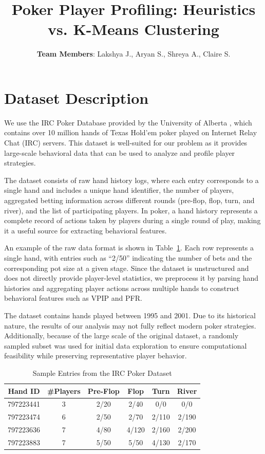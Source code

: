 \documentclass[11pt]{extarticle}
\title{Poker Player Profiling: Heuristics vs. K-Means Clustering}
\author{\textbf{Team Members}: Lakshya J., Aryan S., Shreya A., Claire S.\\}
\date{}
\begin{document}
\maketitle

\section{Dataset Description}
We use the IRC Poker Database provided by the University of Alberta \cite{irc_poker_dataset}, which contains over 10 million hands of Texas Hold'em poker played on Internet Relay Chat (IRC) servers. This dataset is well-suited for our problem as it provides large-scale behavioral data that can be used to analyze and profile player strategies.

The dataset consists of raw hand history logs, where each entry corresponds to a single hand and includes a unique hand identifier, the number of players, aggregated betting information across different rounds (pre-flop, flop, turn, and river), and the list of participating players. In poker, a hand history represents a complete record of actions taken by players during a single round of play, making it a useful source for extracting behavioral features.

An example of the raw data format is shown in Table~\ref{tab:dataset_sample}. Each row represents a single hand, with entries such as ``2/50'' indicating the number of bets and the corresponding pot size at a given stage. Since the dataset is unstructured and does not directly provide player-level statistics, we preprocess it by parsing hand histories and aggregating player actions across multiple hands to construct behavioral features such as VPIP and PFR.

The dataset contains hands played between 1995 and 2001. Due to its historical nature, the results of our analysis may not fully reflect modern poker strategies. Additionally, because of the large scale of the original dataset, a randomly sampled subset was used for initial data exploration to ensure computational feasibility while preserving representative player behavior.

\begin{table}[h]
\centering
\small
\begin{tabular}{c c c c c c}
\hline
Hand ID & \#Players & Pre-Flop & Flop & Turn & River \\
\hline
797223441 & 3 & 2/20 & 2/40 & 0/0 & 0/0 \\
797223474 & 6 & 2/50 & 2/70 & 2/110 & 2/190 \\
797223636 & 7 & 4/80 & 4/120 & 2/160 & 2/200 \\
797223883 & 7 & 5/50 & 5/50 & 4/130 & 2/170 \\
\hline
\end{tabular}
\caption{Sample Entries from the IRC Poker Dataset}
\label{tab:dataset_sample}
\end{table}
\end{document}
